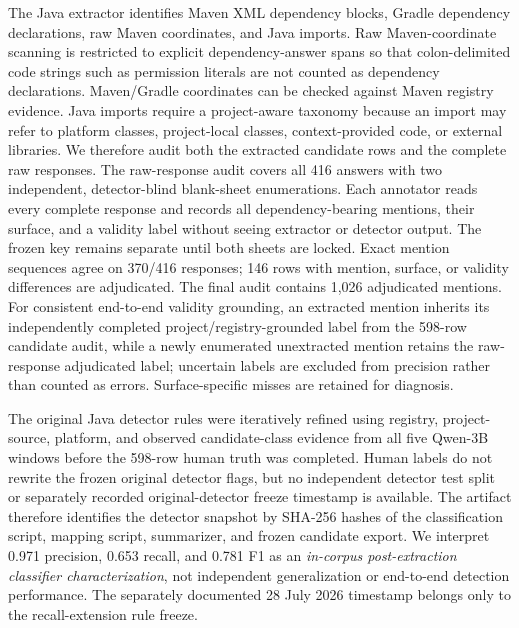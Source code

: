 \documentclass[pdflatex,sn-basic]{sn-jnl}
\begin{document}
The Java extractor identifies Maven XML dependency blocks, Gradle dependency declarations, raw Maven coordinates, and Java imports. Raw Maven-coordinate scanning is restricted to explicit dependency-answer spans so that colon-delimited code strings such as permission literals are not counted as dependency declarations. Maven/Gradle coordinates can be checked against Maven registry evidence. Java imports require a project-aware taxonomy because an import may refer to platform classes, project-local classes, context-provided code, or external libraries. We therefore audit both the extracted candidate rows and the complete raw responses. The raw-response audit covers all 416 answers with two independent, detector-blind blank-sheet enumerations. Each annotator reads every complete response and records all dependency-bearing mentions, their surface, and a validity label without seeing extractor or detector output. The frozen key remains separate until both sheets are locked. Exact mention sequences agree on 370/416 responses; 146 rows with mention, surface, or validity differences are adjudicated. The final audit contains 1,026 adjudicated mentions. For consistent end-to-end validity grounding, an extracted mention inherits its independently completed project/registry-grounded label from the 598-row candidate audit, while a newly enumerated unextracted mention retains the raw-response adjudicated label; uncertain labels are excluded from precision rather than counted as errors. Surface-specific misses are retained for diagnosis.

The original Java detector rules were iteratively refined using registry, project-source, platform, and observed candidate-class evidence from all five Qwen-3B windows before the 598-row human truth was completed. Human labels do not rewrite the frozen original detector flags, but no independent detector test split or separately recorded original-detector freeze timestamp is available. The artifact therefore identifies the detector snapshot by SHA-256 hashes of the classification script, mapping script, summarizer, and frozen candidate export. We interpret 0.971 precision, 0.653 recall, and 0.781 F1 as an \emph{in-corpus post-extraction classifier characterization}, not independent generalization or end-to-end detection performance. The separately documented 28 July 2026 timestamp belongs only to the recall-extension rule freeze.
\end{document}
